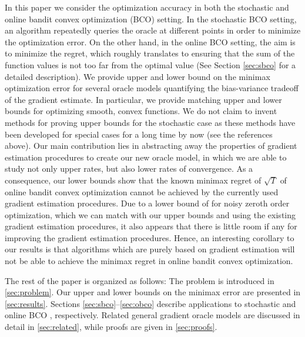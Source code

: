 In this paper we consider the optimization accuracy in both the stochastic and online bandit convex optimization (BCO) setting.
In the stochastic BCO setting, an algorithm repeatedly queries the oracle at different points in order to minimize the optimization error. On the other hand, in the online BCO setting, the aim is to minimize the regret, which roughly translates to ensuring that the sum of the function values is not too far from the optimal value (See Section \ref{sec:sbco} for a detailed description).
We  provide upper and lower bound on the minimax optimization error for several oracle models quantifying the bias-variance tradeoff of the gradient estimate. In particular, we provide matching upper and lower bounds for optimizing smooth, convex functions. We do not claim to invent methods for proving upper bounds for the stochastic case
as these methods have been developed for special cases for a long time by now (see the references above).
Our main contribution lies in abstracting away the properties of gradient estimation procedures
to create our new oracle model, in which we are able to study not only upper rates, but also lower rates of convergence.
As a consequence, our lower bounds show that the known minimax regret of $\sqrt{T}$ \citep{BubeckDKP15,BuEl15}
of online bandit convex optimization cannot be achieved by the currently used gradient estimation procedures.
Due to a lower bound of \citet{Chen88:LB-AoS} for noisy zeroth order optimization,
which we can match with our upper bounds  and using the existing gradient estimation procedures,
it also appears that there is little room if any for improving the gradient estimation procedures. Hence,
an interesting corollary to our results is that algorithms which are purely based on gradient estimation
will not be able to achieve the minimax regret in online bandit convex optimization.

The rest of the paper is organized as follows: The problem is introduced in \cref{sec:problem}. Our upper and lower bounds on the minimax error are presented in \cref{sec:results}. Sections \ref{sec:sbco}--\ref{sec:obco} describe applications to stochastic and online BCO , respectively. Related general gradient oracle models are discussed in detail in \cref{sec:related}, while proofs are given in \cref{sec:proofs}.


